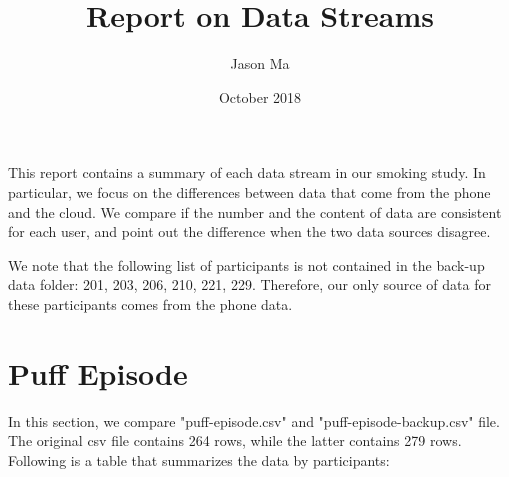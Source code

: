 \documentclass[11pt]{article}
\title{Report on Data Streams}
\author{Jason Ma}
\date{October 2018}
\begin{document}
\maketitle
This report contains a summary of each data stream in our smoking study. In particular, we focus on the differences between data that come from the phone and the cloud. We compare if the number and the content of data are consistent for each user, and point out the difference when the two data sources disagree.

\linebreak
We note that the following list of participants is not contained in the back-up data folder: 201, 203, 206, 210, 221, 229. Therefore, our only source of data for these participants comes from the phone data.

\section{Puff Episode}
In this section, we compare "puff-episode.csv" and "puff-episode-backup.csv" file. The original csv file contains 264 rows, while the latter contains 279 rows. Following is a table that summarizes the data by participants:
\end{document}
